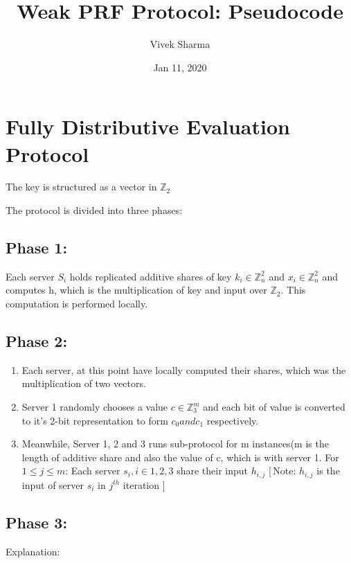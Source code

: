 \documentclass[11pt]{article}
\title{Weak PRF Protocol: Pseudocode}
\author{Vivek Sharma}
\date{Jan 11, 2020}
\begin{document}
\maketitle


\section{Fully Distributive Evaluation Protocol}
The key is structured as a vector in $\mathbb{Z}_2$


The protocol is divided into three phases:

\subsection{Phase 1:} 
Each server $S_{i}$ holds replicated additive shares of key $k_{i} \in \mathbb{Z}_{n}^{2}$ and $x_{i} \in \mathbb{Z}_{n}^{2}$ and computes h, which is the multiplication of key and input over $\mathbb{Z}_2$. This computation is performed locally. 
\subsection{Phase 2:}

\begin{enumerate}
	\item Each server, at this point have locally computed their shares, which was the multiplication of two vectors.
	\item Server 1 randomly chooses a value $c \in \mathbb{Z}_{3}^{m}$ and each bit of value is converted to it's 2-bit representation to form $c_{0} and c_{1}$ respectively. 
	\item Meanwhile, Server 1, 2 and 3 runs sub-protocol for m instances(m is the length of additive share and also the value of c, which is with server 1.
	\subitem For $1 \leq j \leq m$:
	\subitem Each server $s_{i} , i \in {1,2,3}$ share their input $h_{i,j}$ [\,Note: $h_{i,j}$ is the input of server $s_{i}$ in $j^{th}$ iteration ]\,
\end{enumerate}

\subsection{Phase 3:}


 
Explanation:
\end{document}
